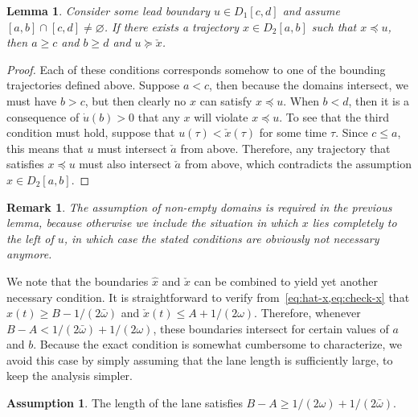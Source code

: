 \documentclass{report}
\theoremstyle{definition}
\newtheorem{assump}{Assumption}[chapter]
\theoremstyle{plain}
\newtheorem{lemma}{Lemma}[chapter]
\newtheorem*{remark}{Remark}
\begin{document}
\begin{lemma}\label{lemma:necessary-conditions}
  Consider some lead boundary $u \in D_{1}[c,d]$ and assume
  $[a,b] \cap [c,d] \neq \varnothing$. If there exists a trajectory
  $x \in D_{2}[a, b]$ such that $x \preceq u$, then $a \geq c$ and $b \geq d$ and $u \succeq \check{x}$.
\end{lemma}
\pagebreak[1]
\begin{proof}
  Each of these conditions corresponds somehow to one of the bounding
  trajectories defined above.
  Suppose $a < c$, then because the domains intersect, we must have $b > c$, but
  then clearly no $x$ can satisfy $x \preceq u$.
  When $b < d$, then it is a consequence of $\dot{u}(b) > 0$ that any $x$ will
  violate $x \preceq u$.
  To see that the third condition must hold, suppose that $u(\tau) < \check{x}(\tau)$
  for some time $\tau$. Since $c \leq a$, this means that $u$ must intersect
  $\check{a}$ from above. Therefore, any trajectory that satisfies $x \preceq u$
  must also intersect $\check{a}$ from above, which contradicts the assumption
  $x \in D_{2}[a,b]$.
\end{proof}

\begin{remark}
  The assumption of non-empty domains is required in the previous lemma, because
  otherwise we include the situation in which $x$ lies completely to the left of
  $u$, in which case the stated conditions are obviously not necessary anymore.
\end{remark}

We note that the boundaries $\hat{x}$ and $\check{x}$ can be combined to
yield yet another necessary condition.
%
It is straightforward to verify from~\cref{eq:hat-x,eq:check-x} that
$\hat{x}(t) \geq B - 1/(2\bar{\omega})$ and $\check{x}(t) \leq A + 1/(2\omega)$.
%
Therefore, whenever $B - A < 1/(2\bar{\omega}) + 1/(2\omega)$, these boundaries intersect
for certain values of $a$ and $b$.
%
Because the exact condition is somewhat cumbersome to characterize, we avoid
this case by simply assuming that the lane length is sufficiently large, to keep
the analysis simpler.

\begin{assump}\label{assump:lane-length}
  The length of the lane satisfies $B - A \geq 1/(2\omega) + 1/(2\bar{\omega})$.
\end{assump}
\end{document}
